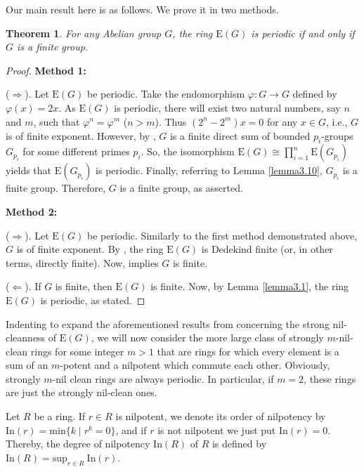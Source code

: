 \documentclass[12pt]{amsart}
\newtheorem{thm}{Theorem}[section]
\theoremstyle{definition}
\theoremstyle{remark}
\numberwithin{equation}{section}
\begin{document}
Our main result here is as follows. We prove it in two methods.

\begin{thm} \label{theorem3.11}
For any Abelian group $G$, the ring $\mathrm{E}(G)$ is periodic if and only if $G$ is a finite group.
\end{thm}

\begin{proof} \textbf{Method 1:}

($\Rightarrow$). Let $\mathrm{E}(G)$ be periodic. Take the endomorphism $\varphi:G \rightarrow G$ defined by $\varphi(x)=2x$. As $\mathrm{E}(G)$ is periodic, there will exist two natural numbers, say $n$ and $m$, such that ${\varphi}^n={\varphi}^m$ ($n>m$). Thus $(2^n-2^m)x=0$ for any $x \in G$, i.e., $G$ is of finite exponent. However, by \cite[Theorem 8.4]{fuchs}, $G$ is a finite direct sum of bounded $p_i$-groups $G_{p_i}$ for some different primes $p_i$. So, the isomorphism $\mathrm{E}(G) \cong \prod_{i=1}^n \mathrm{E}(G_{p_i})$ yields that $\mathrm{E}(G_{p_i})$ is periodic. Finally, referring to Lemma \ref{lemma3.10}, $G_{p_i}$ is a finite group. Therefore, $G$ is a finite group, as asserted.

\medskip

\textbf{Method 2:}

($\Rightarrow$). Let $\mathrm{E}(G)$ be periodic. Similarly to the first method demonstrated above, $G$ is of finite exponent. By \cite[Proposition 2.5]{BCL}, the ring $\mathrm{E}(G)$ is Dedekind finite (or, in other terms, directly finite). Now, \cite[Exercise 15, p.121]{krylov2013endomorphism} implies $G$ is finite.

($\Leftarrow$). If $G$ is finite, then $\mathrm{E}(G)$ is finite. Now, by Lemma \ref{lemma3.1}, the ring $\mathrm{E}(G)$ is periodic, as stated.
\end{proof}

Indenting to expand the aforementioned results from \cite{BCDM} concerning the strong nil-cleanness of $\mathrm{E}(G)$, we will now consider the more large class of strongly $m$-nil-clean rings for some integer $m>1$ that are rings for which every element is a sum of an $m$-potent and a nilpotent which commute each other. Obviously, strongly $m$-nil clean rings are always periodic. In particular, if $m=2$, these rings are just the strongly nil-clean ones.

Let $R$ be a ring. If $r\in R$ is nilpotent, we denote its order of nilpotency by $\mathrm{In}(r) = \mathrm{min}\{k\mid r^k = 0\}$, and if $r$ is not nilpotent we just put $\mathrm{In}(r)=0$. Thereby, the degree of nilpotency $\mathrm{In}(R)$ of $R$ is defined by $\mathrm{In}(R) = \mathrm{sup}_{r\in R}~\mathrm{In}(r)$.
\end{document}
